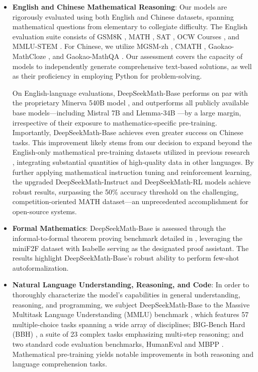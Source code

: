 \begin{itemize}[topsep=0pt]
    \item \textbf{English and Chinese Mathematical Reasoning}: Our models are rigorously evaluated using both English and Chinese datasets, spanning mathematical questions from elementary to collegiate difficulty. The English evaluation suite consists of GSM8K \citep{gsm8k}, MATH \citep{MATH}, SAT \citep{llemma}, OCW Courses \citep{minerva}, and MMLU-STEM \citep{mmlu}. For Chinese, we utilize MGSM-zh \citep{mgsm}, CMATH \citep{wei2023cmath}, Gaokao-MathCloze \citep{agieval}, and Gaokao-MathQA \citep{agieval}. Our assessment covers the capacity of models to independently generate comprehensive text-based solutions, as well as their proficiency in employing Python for problem-solving.

On English-language evaluations, DeepSeekMath-Base performs on par with the proprietary Minerva 540B model \citep{minerva}, and outperforms all publicly available base models—including Mistral 7B \citep{mistral} and Llemma-34B \citep{llemma}—by a large margin, irrespective of their exposure to mathematics-specific pre-training. Importantly, DeepSeekMath-Base achieves even greater success on Chinese tasks. This improvement likely stems from our decision to expand beyond the English-only mathematical pre-training datasets utilized in previous research \citep{minerva,llemma}, integrating substantial quantities of high-quality data in other languages. By further applying mathematical instruction tuning and reinforcement learning, the upgraded DeepSeekMath-Instruct and DeepSeekMath-RL models achieve robust results, surpassing the 50\% accuracy threshold on the challenging, competition-oriented MATH dataset—an unprecedented accomplishment for open-source systems.

\item \textbf{Formal Mathematics}: DeepSeekMath-Base is assessed through the informal-to-formal theorem proving benchmark detailed in \citep{dsp_proof}, leveraging the miniF2F dataset \citep{minif2f} with Isabelle \citep{isabelle} serving as the designated proof assistant. The results highlight DeepSeekMath-Base’s robust ability to perform few-shot autoformalization.
\item \textbf{Natural Language Understanding, Reasoning, and Code}: In order to thoroughly characterize the model’s capabilities in general understanding, reasoning, and programming, we subject DeepSeekMath-Base to the Massive Multitask Language Understanding (MMLU) benchmark \citep{mmlu}, which features 57 multiple-choice tasks spanning a wide array of disciplines; BIG-Bench Hard (BBH) \citep{bbh}, a suite of 23 complex tasks emphasizing multi-step reasoning; and two standard code evaluation benchmarks, HumanEval \citep{codex} and MBPP \citep{mbpp}. Mathematical pre-training yields notable improvements in both reasoning and language comprehension tasks.


\end{itemize}
